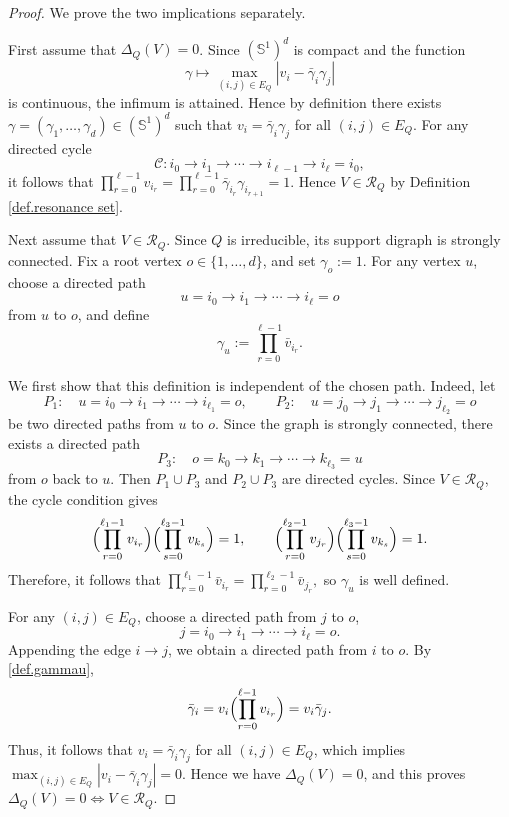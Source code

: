 \documentclass[11pt,twoside, a4paper]{article}
\numberwithin{equation}{section}
\numberwithin{figure}{section}
\theoremstyle{plain} %
\theoremstyle{definition}
\theoremstyle{remark}
\newcommand{\1} {\mspace{1 mu}}
\newcommand{\2} {\mspace{2 mu}}
\begin{document}
\begin{proof}
We prove the two implications separately.

First assume that \(\Delta_Q(V)=0\). Since \((\mathbb S^1)^d\) is compact and the function
\[
    \gamma\mapsto \max_{(i,j)\in E_Q}|v_i-\bar\gamma_i\gamma_j|
\]
is continuous, the infimum is attained. Hence by definition there exists
\(\gamma=(\gamma_1,\dots,\gamma_d)\in (\mathbb S^1)^d\) such that
$
v_i=\bar\gamma_i\gamma_j
$
for all $(i,j)\in E_Q$.
For any directed cycle
\[
\mathscr{C}:i_0\to i_1\to \cdots \to i_{\ell-1}\to i_\ell=i_0,
\]
it follows that
$
\prod_{r=0}^{\ell-1} v_{i_r}
=
\prod_{r=0}^{\ell-1} \bar\gamma_{i_r}\gamma_{i_{r+1}}
=1.
$
Hence \(V\in \mathscr{R}_Q\) by Definition \ref{def.resonance set}.

Next assume that \(V\in \mathscr{R}_Q\). Since \(Q\) is irreducible, its support digraph is strongly connected. Fix a root vertex \(o\in \{1,\dots,d\}\), and set
$
\gamma_o:=1.
$
For any vertex \(u\), choose a directed path
\[
u=i_0\to i_1\to \cdots \to i_\ell=o
\]
from \(u\) to \(o\), and define
\begin{equation}\label{def.gammau}
  \gamma_u:=\prod_{r=0}^{\ell-1} \bar v_{i_r}.  
\end{equation}



We first show that this definition is independent of the chosen path.
Indeed, let
\[
P_1:\quad u=i_0\to i_1\to \cdots \to i_{\ell_1}=o,
\qquad
P_2:\quad u=j_0\to j_1\to \cdots \to j_{\ell_2}=o
\]
be two directed paths from \(u\) to \(o\). Since the graph is strongly connected, there exists a directed path
\[
P_3:\quad o=k_0\to k_1\to \cdots \to k_{\ell_3}=u
\]
from \(o\) back to \(u\). Then \(P_1\cup P_3\) and \(P_2\cup P_3\) are directed cycles. Since \(V\in \mathscr{R}_Q\), the cycle condition gives
\[
\Bigl(\prod_{r=0}^{\ell_1-1}  v_{i_r}\Bigr)\Bigl(\prod_{s=0}^{\ell_3-1}  v_{k_s}\Bigr)=1,
\qquad
\Bigl(\prod_{r=0}^{\ell_2-1}  v_{j_r}\Bigr)\Bigl(\prod_{s=0}^{\ell_3-1} v_{k_s}\Bigr)=1.
\]
Therefore, it follows that
$
\prod_{r=0}^{\ell_1-1} \bar v_{i_r}
=
\prod_{r=0}^{\ell_2-1} \bar v_{j_r},
$
so \(\gamma_u\) is well defined.

For any \((i,j)\in E_Q\), choose a directed path from \(j\) to \(o\),
\[
j=i_0\to i_1\to \cdots \to i_\ell=o.
\]
Appending the edge \(i\to j\), we obtain a directed path from \(i\) to \(o\). By \eqref{def.gammau},
\[
\bar\gamma_i
=
v_i\Bigl(\prod_{r=0}^{\ell-1}  v_{i_r}\Bigr)
=
v_i\bar\gamma_j.
\]
Thus, it follows that
$v_i=\bar\gamma_i\gamma_j$ for all $(i,j)\in E_Q$,
which implies
$
\max_{(i,j)\in E_Q}|v_i-\bar\gamma_i\gamma_j|=0.
$
Hence we have \(\Delta_Q(V)=0\), and this proves
$
\Delta_Q(V)=0
\Longleftrightarrow
V\in \mathscr{R}_Q.
$
\end{proof}
\end{document}
